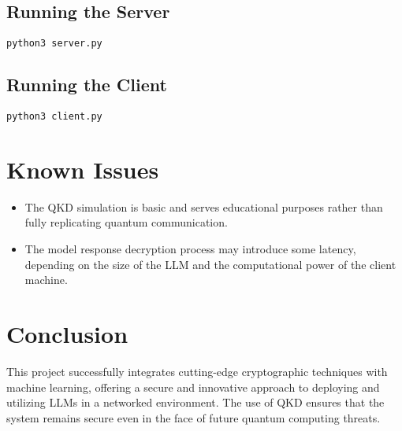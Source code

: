 \documentclass{article}
\begin{document}
\subsection{Running the Server}
\begin{verbatim}
python3 server.py
\end{verbatim}

\subsection{Running the Client}
\begin{verbatim}
python3 client.py
\end{verbatim}

\section{Known Issues}
\begin{itemize}
    \item The QKD simulation is basic and serves educational purposes rather than fully replicating quantum communication.
    \item The model response decryption process may introduce some latency, depending on the size of the LLM and the computational power of the client machine.
\end{itemize}

\section{Conclusion}
This project successfully integrates cutting-edge cryptographic techniques with machine learning, offering a secure and innovative approach to deploying and utilizing LLMs in a networked environment. The use of QKD ensures that the system remains secure even in the face of future quantum computing threats.
\end{document}
